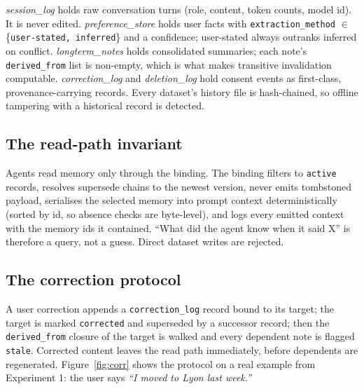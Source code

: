 \documentclass[11pt]{article}
\begin{document}
\emph{session\_log} holds raw conversation turns (role, content, token counts, model id). It is never edited. \emph{preference\_store} holds user facts with \texttt{extraction\_method} $\in$ \{\texttt{user-stated, inferred}\} and a confidence; user-stated always outranks inferred on conflict. \emph{longterm\_notes} holds consolidated summaries; each note's \texttt{derived\_from} list is non-empty, which is what makes transitive invalidation computable. \emph{correction\_log} and \emph{deletion\_log} hold consent events as first-class, provenance-carrying records. Every dataset's history file is hash-chained, so offline tampering with a historical record is detected.

\subsection{The read-path invariant}
Agents read memory only through the binding. The binding filters to \texttt{active} records, resolves supersede chains to the newest version, never emits tombstoned payload, serialises the selected memory into prompt context deterministically (sorted by id, so absence checks are byte-level), and logs every emitted context with the memory ids it contained. ``What did the agent know when it said X'' is therefore a query, not a guess. Direct dataset writes are rejected.

\subsection{The correction protocol}
A user correction appends a \texttt{correction\_log} record bound to its target; the target is marked \texttt{corrected} and superseded by a successor record; then the \texttt{derived\_from} closure of the target is walked and every dependent note is flagged \texttt{stale}. Corrected content leaves the read path immediately, before dependents are regenerated. Figure~\ref{fig:corr} shows the protocol on a real example from Experiment 1: the user says \emph{``I moved to Lyon last week.''}
\end{document}
